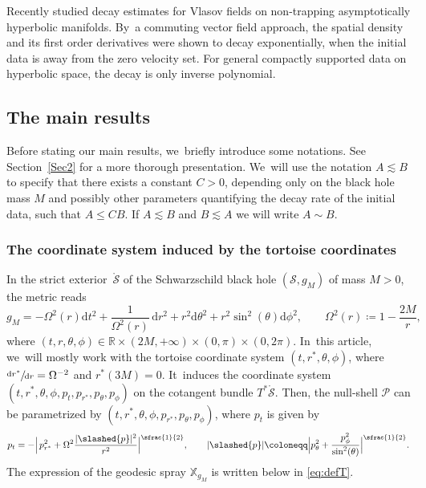 \documentclass[JEP,XML,SOM,Unicode,published]{cedram}
\theoremstyle{plain}
\theoremstyle{definition}
\newcommand\R{{\mathbb{R}}}
\newcommand\T{{\mathbb{X}}}
\newcommand\dr{{\mathrm{d}}}
\begin{document}
Recently \cite{VVel23} studied decay estimates for Vlasov fields on non-trapping asymptotically hyperbolic manifolds. By~a commuting vector field approach, the spatial density and its first order derivatives were shown to decay exponentially, when the initial data is away from the zero velocity set. For general compactly supported data on hyperbolic space, the decay is only inverse polynomial.

\subsection{The main results}

Before stating our main results, we~briefly introduce some notations. See Section~\ref{Sec2} for a more thorough presentation. We~will use the notation $A \lesssim B$ to specify that there exists a constant $C>0$, depending only on the black hole mass $M$ and possibly other parameters quantifying the decay rate of the initial data, such that $A \leq CB$. If $A \lesssim B $ and $B \lesssim A$ we will write $A \sim B$.

\subsubsection{The coordinate system induced by the tortoise coordinates}

In the strict exterior~$\mathring{\mathcal{S}}$ of the Schwarzschild black hole $(\mathcal{S},g_M)$ of mass $M>0$, the metric reads
\[
g_M=-\Omega^2(r)\dr t^2+\frac{1}{\Omega^2(r)}\,\dr r^2+r^2 \dr \theta^2+r^2\sin^2(\theta) \dr \phi^2, \qquad \Omega^2(r)\coloneqq1-\frac{2M}{r},
\]
where $(t,r,\theta, \phi) \in \R \times (2M,+ \infty) \times (0,\pi) \times (0,2 \pi)$. In~this article, we~will mostly work with the tortoise coordinate system $(t,r^*,\theta, \phi)$, where $\sfrac{\dr r^*}{\dr r}=\Omega^{-2}$ and $r^*(3M)=0$. It~induces the coordinate system $(t,r^*,\theta,\phi,p_t,p_{r^*},p_{\theta}, p_{\phi})$ on the cotangent bundle $T^* \mathring{\mathcal{S}}$. Then, the null-shell $\mathcal{P}$ can be parametrized by $(t,r^*,\theta,\phi,p_{r^*},p_{\theta}, p_{\phi})$, where $p_t$ is given by
\begin{equation*}
p_t = - \Bigl| \,p_{r^*}^2 + \Omega^2 \frac{|\slashed{p}|^2}{r^2} \Bigr|^{\sfrac{1}{2}},\qquad |\slashed{p}| \coloneqq \Bigl|p_{\theta}^2+\frac{ p_{\phi}^2}{\sin^2 (\theta) }\Bigr|^{\sfrac{1}{2}}.
\end{equation*}
The expression of the geodesic spray $\T_{g_M}$ is written below in \eqref{eq:defT}.
\end{document}
